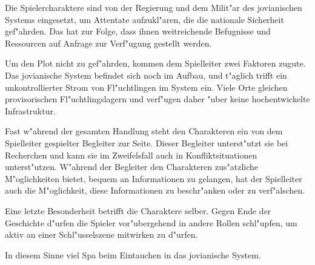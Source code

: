 Die Spielercharaktere sind von der Regierung und dem Milit"ar des jovianischen Systems eingesetzt, um Attentate aufzukl"aren, die die nationale Sicherheit gef"ahrden. Das hat zur Folge, dass ihnen weitreichende Befugnisse und Ressourcen auf Anfrage zur Verf"ugung gestellt werden.

Um den Plot nicht zu gef"ahrden, kommen dem Spielleiter zwei Faktoren zugute. Das jovianische System befindet sich noch im Aufbau, und t"aglich trifft ein unkontrollierter Strom von Fl"uchtlingen im System ein. Viele Orte gleichen provisorischen Fl"uchtlingslagern und verf"ugen daher "uber keine hochentwickelte Infrastruktur.

Fast w"ahrend der gesamten Handlung steht den Charakteren ein von dem Spielleiter gespielter Begleiter zur Seite. Dieser Begleiter unterst"utzt sie bei Recherchen und kann sie im Zweifelsfall auch in Konfliktsituationen unterst"utzen. W"ahrend der Begleiter den Charakteren zus"atzliche M"oglichkeiten bietet, bequem an Informationen zu gelangen, hat der Spielleiter auch die M"oglichkeit, diese Informationen zu beschr"anken oder zu verf"alschen.

Eine letzte Besonderheit betrifft die Charaktere selber. Gegen Ende der Geschichte d"urfen die Spieler vor"ubergehend in andere Rollen schl"upfen, um aktiv an einer Schl"usselszene mitwirken zu d"urfen.

\vspace{1.5cm}
\begin{center}{\large{}In diesem Sinne viel Spa\3 beim Eintauchen in das jovianische System.}\end{center}